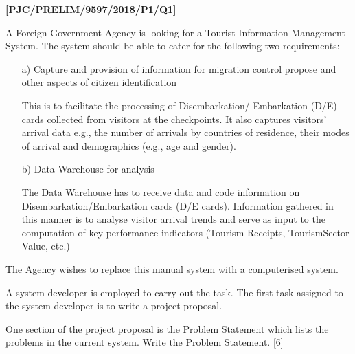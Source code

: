 \item \textbf{{[}PJC/PRELIM/9597/2018/P1/Q1{]} }

\noindent A Foreign Government Agency is looking for a Tourist Information
Management System. The system should be able to cater for the following
two requirements: 
\begin{enumerate}
\item[a)]  Capture and provision of information for migration control propose
and other aspects of citizen identification 

This is to facilitate the processing of Disembarkation/ Embarkation
(D/E) cards collected from visitors at the checkpoints. It also captures
visitors\textquoteright{} arrival data e.g., the number of arrivals
by countries of residence, their modes of arrival and demographics
(e.g., age and gender). 
\item[b)]  Data Warehouse for analysis 

The Data Warehouse has to receive data and code information on Disembarkation/Embarkation
cards (D/E cards). Information gathered in this manner is to analyse
visitor arrival trends and serve as input to the computation of key
performance indicators (Tourism Receipts, TourismSector Value, etc.)
\end{enumerate}
The Agency wishes to replace this manual system with a computerised
system.

\noindent A system developer is employed to carry out the task. The
first task assigned to the system developer is to write a project
proposal.

One section of the project proposal is the Problem Statement which
lists the problems in the current system. Write the Problem Statement.\hfill{}
{[}6{]}